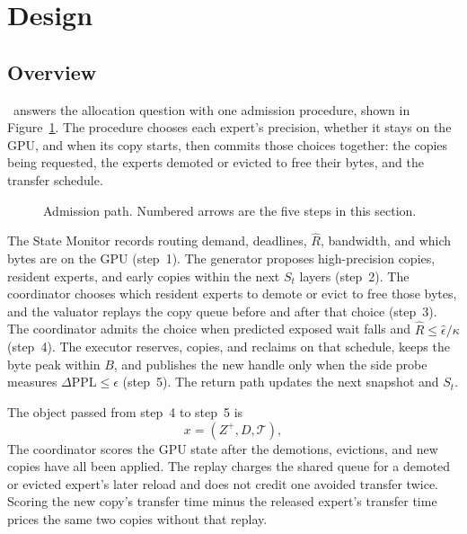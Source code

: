\section{Design}
\label{sec:design}

\subsection{Overview}
\label{sec:model}

\systemname\ answers the allocation question with one admission procedure, shown in Figure~\ref{fig:arch}.
The procedure chooses each expert's precision, whether it stays on the GPU, and when its copy starts, then commits those choices together: the copies being requested, the experts demoted or evicted to free their bytes, and the transfer schedule.

\begin{figure}[t]
  \centering
  
  \caption{Admission path. Numbered arrows are the five steps in this section.}
  \label{fig:arch}
\end{figure}

The State Monitor records routing demand, deadlines, \(\widehat R\), bandwidth, and which bytes are on the GPU (step~1).
The generator proposes high-precision copies, resident experts, and early copies within the next \(S_t\) layers (step~2).
The coordinator chooses which resident experts to demote or evict to free those bytes, and the valuator replays the copy queue before and after that choice (step~3).
The coordinator admits the choice when predicted exposed wait falls and \(\widehat R\le\widehat\epsilon/\kappa\) (step~4).
The executor reserves, copies, and reclaims on that schedule, keeps the byte peak within \(B\), and publishes the new handle only when the side probe measures \(\Delta\mathrm{PPL}\le\epsilon\) (step~5).
The return path updates the next snapshot and \(S_t\).

The object passed from step~4 to step~5 is
\begin{equation}
  x=(Z^{+},D,\mathcal{T}),
  \label{eq:exchange}
\end{equation}
The coordinator scores the GPU state after the demotions, evictions, and new copies have all been applied. The replay charges the shared queue for a demoted or evicted expert's later reload and does not credit one avoided transfer twice. Scoring the new copy's transfer time minus the released expert's transfer time prices the same two copies without that replay.

